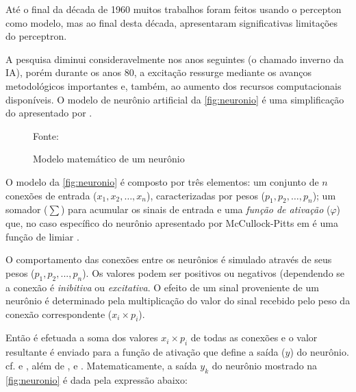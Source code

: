 Até o final da década de 1960 muitos trabalhos foram feitos usando o percepton como modelo, mas ao final desta década,  apresentaram significativas limitações do perceptron. 

A pesquisa diminui consideravelmente nos anos seguintes (o chamado inverno da IA), porém durante  os  anos  80,  a excitação	ressurge mediante os avanços metodológicos importantes e, também, ao aumento dos recursos computacionais disponíveis. O  modelo  de  neurônio  artificial  da \autoref{fig:neuronio} é uma simplificação do apresentado por .

\begin{figure}[h!]
	\centering
	\caption{Modelo matemático de um neurônio}
	
	{\scriptsize 	Fonte: }	
	\label{fig:neuronio}
\end{figure}

O modelo da \autoref{fig:neuronio} é composto por três elementos:  um conjunto de $ n $ conexões de entrada ($ x_1, x_2, \dots , x_n $), caracterizadas por pesos ($ p_1, p_2, \dots, p_n $); um somador ($ \sum $) para acumular os sinais de entrada e uma \textit{função de ativação} ($\varphi$) que, no caso específico do neurônio apresentado por McCullock-Pitts em  é uma função de limiar \cite{ferneda_redes_2006} \cite{lima_ia_2016}.

O comportamento das conexões entre os neurônios é simulado através de seus pesos  ($ p_1, p_2, ..., p_n $). Os valores podem ser positivos ou negativos (dependendo se a conexão é \textit{inibitiva} ou \textit{excitativa}. O efeito de um sinal proveniente de um neurônio é determinado pela multiplicação do valor do sinal recebido pelo peso da conexão correspondente ($x_i \times p_i$).

Então é efetuada a soma dos valores $x_i \times p_i$ de todas as conexões e o valor resultante é enviado para a função de ativação que define a saída ($y$) do neurônio. cf.  e , além de ,  e . Matematicamente, a saída $y_k$ do neurônio mostrado na \autoref{fig:neuronio} é dada pela expressão abaixo:

